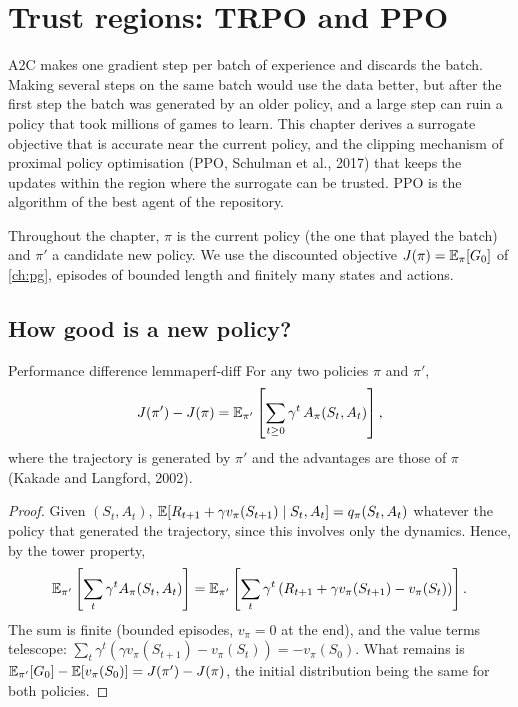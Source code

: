 \chapter{Trust regions: TRPO and PPO}
\label{ch:ppo}

A2C makes one gradient step per batch of experience and discards the
batch. Making several steps on the same batch would use the data better,
but after the first step the batch was generated by an older policy, and a
large step can ruin a policy that took millions of games to learn. This
chapter derives a surrogate objective that is accurate near the current
policy, and the clipping mechanism of proximal policy optimisation (PPO,
Schulman et al., 2017) that keeps the updates within the region where the
surrogate can be trusted. PPO is the algorithm of the best agent of the
repository.

Throughout the chapter, $\pi$ is the current policy (the one that played
the batch) and $\pi'$ a candidate new policy. We use the discounted
objective $J(\pi) = \mathbb{E}_\pi[G_0]$ of \cref{ch:pg}, episodes of bounded length
and finitely many states and actions.

\section{How good is a new policy?}

\begin{lemma}{Performance difference lemma}{perf-diff}
  For any two policies $\pi$ and $\pi'$,
  \begin{equation}
    \label{eq:perf-diff}
    J(\pi') - J(\pi) = \mathbb{E}_{\pi'}\left[ \sum_{t \geq 0} \gamma^t\,
    A_\pi(S_t, A_t) \right],
  \end{equation}
  where the trajectory is generated by $\pi'$ and the advantages are those
  of $\pi$ (Kakade and Langford, 2002).
\end{lemma}

\begin{proof}
  Given $(S_t, A_t)$, $\mathbb{E}[R_{t+1} + \gamma v_\pi(S_{t+1}) \mid S_t, A_t] =
  q_\pi(S_t, A_t)$ whatever the policy that generated the trajectory, since
  this involves only the dynamics. Hence, by the tower property,
  \begin{equation*}
    \mathbb{E}_{\pi'}\left[ \sum_t \gamma^t A_\pi(S_t, A_t) \right]
    = \mathbb{E}_{\pi'}\left[ \sum_t \gamma^t \left( R_{t+1} + \gamma v_\pi(S_{t+1})
      - v_\pi(S_t) \right) \right].
  \end{equation*}
  The sum is finite (bounded episodes, $v_\pi = 0$ at the end), and the
  value terms telescope: $\sum_t \gamma^t (\gamma v_\pi(S_{t+1}) -
  v_\pi(S_t)) = -v_\pi(S_0)$. What remains is $\mathbb{E}_{\pi'}[G_0] -
  \mathbb{E}[v_\pi(S_0)] = J(\pi') - J(\pi)$, the initial distribution being the
  same for both policies.
\end{proof}

